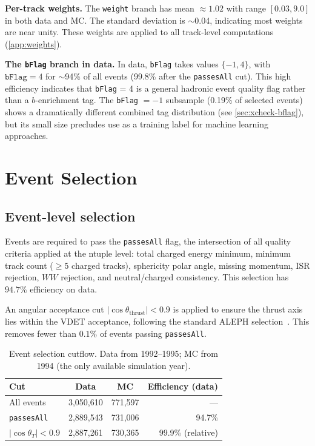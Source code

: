 \documentclass[11pt,a4paper]{article}
\begin{document}
\textbf{Per-track weights.}
The \texttt{weight} branch has mean $\approx 1.02$ with range
$[0.03, 9.0]$ in both data and MC.
The standard deviation is $\sim$0.04, indicating most weights are
near unity.
These weights are applied to all track-level computations
(\cref{app:weights}).

\textbf{The \texttt{bFlag} branch in data.}
In data, \texttt{bFlag} takes values $\{-1, 4\}$, with
$\texttt{bFlag} = 4$ for $\sim$94\% of all events (99.8\% after
the \texttt{passesAll} cut).
This high efficiency indicates that \texttt{bFlag} = 4 is a
general hadronic event quality flag rather than a $b$-enrichment
tag.
The \texttt{bFlag} $= -1$ subsample (0.19\% of selected events)
shows a dramatically different combined tag distribution
(see \cref{sec:xcheck-bflag}), but its small size precludes
use as a training label for machine learning approaches.

\section{Event Selection}
\label{sec:selection}

\subsection{Event-level selection}
\label{sec:selection:event}

Events are required to pass the \texttt{passesAll} flag, the
intersection of all quality criteria applied at the ntuple level:
total charged energy minimum, minimum track count ($\geq 5$ charged
tracks), sphericity polar angle, missing momentum, ISR rejection,
$WW$ rejection, and neutral/charged consistency.
This selection has $94.7\%$ efficiency on data.

An angular acceptance cut $|\cos\theta_\text{thrust}| < 0.9$ is
applied to ensure the thrust axis lies within the VDET acceptance,
following the standard ALEPH selection~\cite{ALEPH:AFBb}.
This removes fewer than $0.1\%$ of events passing \texttt{passesAll}.

\begin{table}[htbp]
\centering
\caption{Event selection cutflow. Data from 1992--1995;
MC from 1994 (the only available simulation year).}
\label{tbl:cutflow}
\begin{tabular}{lccr}
\toprule
Cut & Data & MC & Efficiency (data) \\
\midrule
All events        & 3,050,610 & 771,597 & --- \\
\texttt{passesAll}& 2,889,543 & 731,006 & 94.7\% \\
$|\cos\theta_T| < 0.9$ & 2,887,261 & 730,365 & 99.9\% (relative) \\
\bottomrule
\end{tabular}
\end{table}
\end{document}
